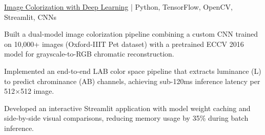 \begin{cvproject}{\href{https://github.com/grvsnh/Image-Colorization}{\uline{Image Colorization with Deep Learning}} | Python, TensorFlow, OpenCV, Streamlit, CNNs}{}
    \item Built a dual-model image colorization pipeline combining a custom CNN trained on 10,000+ images (Oxford-IIIT Pet dataset) with a pretrained ECCV 2016 model for grayscale-to-RGB chromatic reconstruction.
    \item Implemented an end-to-end LAB color space pipeline that extracts luminance (L) to predict chrominance (AB) channels, achieving sub-120ms inference latency per 512$\times$512 image.
    \item Developed an interactive Streamlit application with model weight caching and side-by-side visual comparisons, reducing memory usage by 35\% during batch inference.
\end{cvproject}